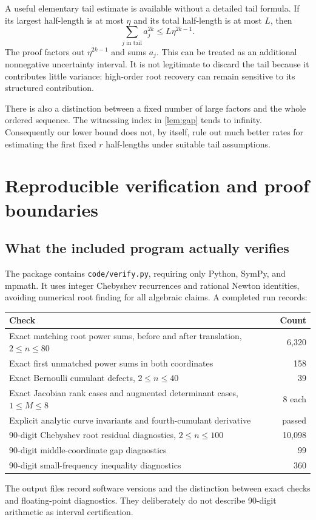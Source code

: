 \documentclass[11pt,a4paper]{article}
\theoremstyle{definition}
\theoremstyle{remark}
\begin{document}
A useful elementary tail estimate is available without a detailed tail
formula. If its largest half-length is at most $\eta$ and its total
half-length is at most $L$, then
\begin{equation}\label{eq:tail-noise}
 \sum_{j\text{ in tail}}a_j^{2k}\le L\eta^{2k-1}.
\end{equation}
The proof factors out $\eta^{2k-1}$ and sums $a_j$. This can be treated
as an additional nonnegative uncertainty interval. It is not legitimate
to discard the tail because it contributes little variance: high-order
root recovery can remain sensitive to its structured contribution.

There is also a distinction between a fixed number of large factors and
the whole ordered sequence. The witnessing index in \cref{lem:gap} tends
to infinity. Consequently our lower bound does not, by itself, rule out
much better rates for estimating the first fixed $r$ half-lengths under
suitable tail assumptions.

\section{Reproducible verification and proof boundaries}
\label{sec:verification}

\subsection{What the included program actually verifies}

The package contains \texttt{code/verify.py}, requiring only Python,
SymPy, and mpmath. It uses integer Chebyshev recurrences and rational
Newton identities, avoiding numerical root finding for all algebraic
claims. A completed run records:
\begin{center}
\small
\begin{tabular}{@{}p{}r@{}}
\toprule
Check & Count\\
\midrule
Exact matching root power sums, before and after translation, $2\le n\le80$ & 6,320\\
Exact first unmatched power sums in both coordinates & 158\\
Exact Bernoulli cumulant defects, $2\le n\le40$ & 39\\
Exact Jacobian rank cases and augmented determinant cases, $1\le M\le8$ & 8 each\\
Explicit analytic curve invariants and fourth-cumulant derivative & passed\\
90-digit Chebyshev root residual diagnostics, $2\le n\le100$ & 10,098\\
90-digit middle-coordinate gap diagnostics & 99\\
90-digit small-frequency inequality diagnostics & 360\\
\bottomrule
\end{tabular}
\end{center}
The output files record software versions and the distinction between exact
checks and floating-point diagnostics. They deliberately do not describe
90-digit arithmetic as interval certification.
\end{document}
